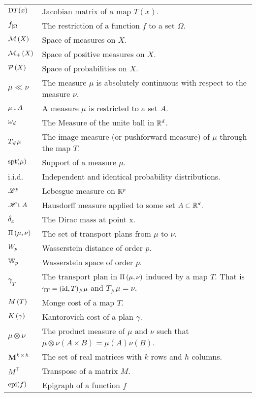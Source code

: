 \begin{tabular}{ l l }
	$\mathrm{D} T(x)$ & Jacobian matrix of a map $T(x)$. \\
	${f}_{\left| \Omega \right.}$ & The restriction of a function $f$ to a set $\Omega$. \\
	$\mathcal{M}\left( X \right)$ & Space of measures on $X$. \\
	$\mathcal{M}_+\left( X \right)$ & Space of positive measures on $X$. \\
	$\mathcal{P}\left( X \right)$ & Space of probabilities on $X$. \\	
	$\mu \ll\nu$ & The measure $\mu$ is absolutely continuous with respect to the measure $\nu$. \\
	$\mu \measurerestr A$ & A measure $\mu$ is restricted to a set $A$.\\
	$\omega_d$ & The Measure of the unite ball in $\mathbb{R}^d$. \\
	${T}_{\#} \mu$ &  The image measure (or pushforward measure) of $\mu$ through the map $T$.\\
	$\mathrm{spt}(\mu)$& Support of a measure $\mu$.\\
	i.i.d. & Independent and identical probability distributions.\\
	$\mathscr{L}^p$ & Lebesgue measure on $\mathbb{R}^p$\\
	$\Hausdorff\measurerestr A$ & Hausdorff measure applied to some set $A \subset \mathbb{R}^d$. \\
	$\delta_x$ & The Dirac mass at point x. \\
	$\Pi\left(\mu, \nu\right)$ & The set of transport plans from $\mu$ to $\nu$.\\
	$W_{p}$ & Wasserstein distance of order $p$. \\	
	$\mathbb{W}_{p}$ & Wasserstein space of order $p$.\\
 	$\gamma_T$ & The transport plan in $\Pi\left(\mu, \nu\right)$ induced by a map $T$. That is $\gamma_T = (\mathrm{id}, T)_\#\mu$ and $T_\#\mu=\nu$. \\
	$M\left(T\right)$ & Monge cost of a map $T$. \\
	$K\left(\gamma\right)$ & Kantorovich cost of a plan $\gamma$. \\	
	$\mu \otimes \nu$ & The product measure of $\mu$ and $\nu$ such that $\mu \otimes \nu (A\times B)= \mu(A)\nu(B)$.\\
	$\mathbf{M}^{k\times h}$ & The set of real matrices with $k$ rows and $h$ columns. \\
	$M^\top$ & Transpose of a matrix $M$. \\
	$\mathrm{epi}(f)$ & Epigraph of a function $f$
\end{tabular}
